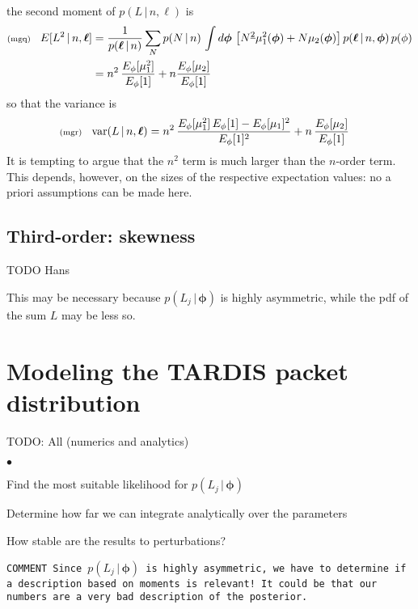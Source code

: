 \documentclass[11pt]{article}
\newcommand{\lleq}[1]{\label{#1} }
\renewcommand{\lleq}[1]{\label{#1} {\scriptstyle {\rm (#1)}} \hspace*{2ex} }
\newenvironment{mtemize}{
  \begin{list}{$\bullet$}
    {\setlength{\itemsep}{0pt}
     \setlength{\leftmargin}{3ex}
    }
  }
  {\end{list}}
\newcommand{\cond}{\,|\,}
\newcommand{\var}{\mathrm{var}}
\newcommand{\bml}{{\bm{\ell}}}
\newcommand{\bmphi}{{\bm{\phi}}}
\begin{document}
the second moment of $p(L\cond n,\bml)$ is
\begin{align}
  \lleq{mgq}
  E[L^2\cond n,\bml]
  &= \frac{1}{p(\bml\cond n)}
  \sum_N p(N\cond n)\, \int d\bmphi\,
  \left[ N^{\underline{2}}\mu_1^2(\bmphi) + N \mu_2(\bmphi)\right]
  p(\bml\cond n,\bmphi) \, p(\phi) \\
  &= n^2\,\frac{E_\phi[\mu_1^2]}{E_\phi[1]}
  + n \frac{E_\phi[\mu_2]}{E_\phi[1]}
\end{align}
so that the variance is
\begin{align}
  \lleq{mgr}
  \var(L\cond n,\bml)
  &= n^2\, \frac{E_\phi[\mu_1^2]\,E_\phi[1] -  E_\phi[\mu_1]^2}
  {E_\phi[1]^2}
  + n\, \frac{E_\phi[\mu_2]}{E_\phi[1]}
\end{align}
It is tempting to argue that the $n^2$ term is much larger than the
$n$-order term. This depends, however, on the sizes of the respective
expectation values: no a priori assumptions can be made here.

\subsection{Third-order: skewness}

TODO Hans

This may be necessary because $p(L_j\cond\bmphi)$ is highly
asymmetric, while the pdf of the sum $L$ may be less so.



\section{Modeling the TARDIS packet distribution}

TODO: All (numerics and analytics)

\begin{mtemize}
\item Find the most suitable likelihood for $p(L_j\cond \bmphi)$

\item Determine how far we can integrate analytically over the
parameters

\item How stable are the results to perturbations?

\item \texttt{COMMENT Since $p(L_j\cond \bmphi)$ is highly asymmetric,
    we have to determine if a description based on moments is
    relevant! It could be that our numbers are a very bad description
    of the posterior.}

\end{mtemize}
\end{document}
